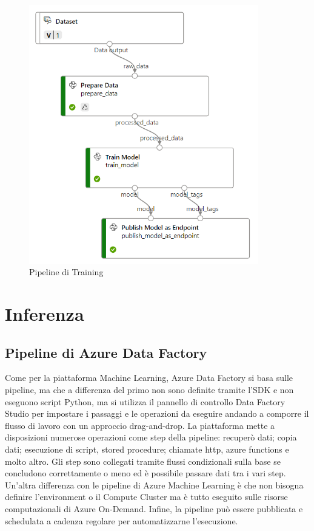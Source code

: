 \begin{figure}[t]
	\centering
	\includegraphics[width=10cm, scale=1]{images/pipeline}
	\caption{Pipeline di Training}
	\label{pipeline-training}
\end{figure}

\section{Inferenza}
\subsection{Pipeline di Azure Data Factory}
Come per la piattaforma Machine Learning, Azure Data Factory si basa sulle pipeline, ma che a differenza del primo non sono definite tramite l'SDK e non eseguono script Python, ma si utilizza il pannello di controllo Data Factory Studio per impostare i passaggi e le operazioni da eseguire andando a comporre il flusso di lavoro con un approccio drag-and-drop.
La piattaforma mette a disposizioni numerose operazioni come step della pipeline: recuperò dati; copia dati; esecuzione di script, stored procedure; chiamate http, azure functions e molto altro. 
Gli step sono collegati tramite flussi condizionali sulla base se concludono correttamente o meno ed è possibile passare dati tra i vari step.
Un'altra differenza con le pipeline di Azure Machine Learning è che non bisogna definire l'environment o il Compute Cluster ma è tutto eseguito sulle risorse computazionali di Azure On-Demand.
Infine, la pipeline può essere pubblicata e schedulata a cadenza regolare per automatizzarne l'esecuzione.
